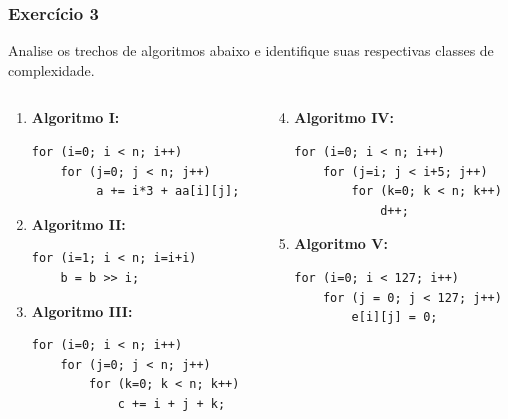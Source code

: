 \documentclass[aspectratio=169]{beamer}
\begin{document}
\begin{frame}[fragile]\frametitle{Exercício 3} %
Analise os trechos de algoritmos abaixo e identifique suas respectivas classes de complexidade.

\begin{columns}[T]
\begin{column}{0.5\linewidth}
\begin{enumerate}
	\item \textbf{Algoritmo I:}
{\scriptsize
\begin{verbatim}
for (i=0; i < n; i++)
    for (j=0; j < n; j++)
         a += i*3 + aa[i][j];
\end{verbatim}
}
	\item \textbf{Algoritmo II:}
{\scriptsize
\begin{verbatim}
for (i=1; i < n; i=i+i)
    b = b >> i;
\end{verbatim}
}
	\item \textbf{Algoritmo III:}
{\scriptsize
\begin{verbatim}
for (i=0; i < n; i++)
    for (j=0; j < n; j++)
        for (k=0; k < n; k++)
            c += i + j + k;
\end{verbatim}
}
\end{enumerate}
\end{column}
\begin{column}{0.5\linewidth}
\begin{enumerate}
	\setcounter{enumi}{3}
	\item \textbf{Algoritmo IV:}
{\scriptsize
\begin{verbatim}
for (i=0; i < n; i++)
    for (j=i; j < i+5; j++)
        for (k=0; k < n; k++)
            d++;
\end{verbatim}
}
	\item \textbf{Algoritmo V:}
{\scriptsize
\begin{verbatim}
for (i=0; i < 127; i++)
    for (j = 0; j < 127; j++)
        e[i][j] = 0;
\end{verbatim}
}
\end{enumerate}
\end{column}
\end{columns}
\end{frame}
\end{document}
